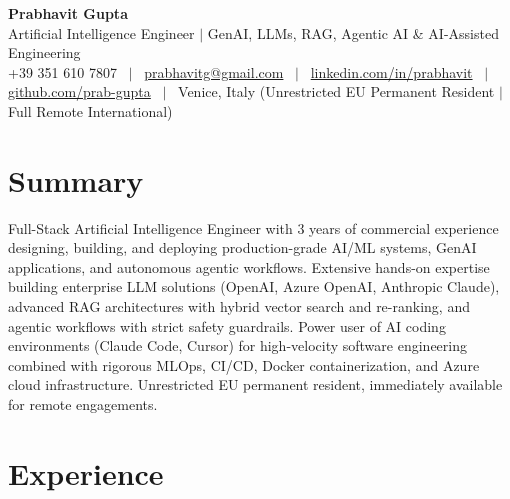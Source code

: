 \documentclass[a4paper,10pt]{article}
\begin{document}
\begin{minipage}[c]{0.80\textwidth}
  {\Huge\bfseries Prabhavit Gupta}\\[3pt]
  {\color{accent}\large Artificial Intelligence Engineer $\vert$ GenAI, LLMs, RAG, Agentic AI \& AI-Assisted Engineering}\\[6pt]
  {\footnotesize +39 351 610 7807 ~$\vert$~
  \href{mailto:prabhavitg@gmail.com}{prabhavitg@gmail.com} ~$\vert$~
  \href{https://www.linkedin.com/in/prabhavit/}{linkedin.com/in/prabhavit} ~$\vert$~
  \href{https://github.com/prab-gupta}{github.com/prab-gupta} ~$\vert$~
  Venice, Italy (Unrestricted EU Permanent Resident $\vert$ Full Remote International)}
\end{minipage}\hfill

\section{Summary}
Full-Stack Artificial Intelligence Engineer with 3 years of commercial experience designing, building, and deploying production-grade AI/ML systems, GenAI applications, and autonomous agentic workflows. Extensive hands-on expertise building enterprise LLM solutions (OpenAI, Azure OpenAI, Anthropic Claude), advanced RAG architectures with hybrid vector search and re-ranking, and agentic workflows with strict safety guardrails. Power user of AI coding environments (Claude Code, Cursor) for high-velocity software engineering combined with rigorous MLOps, CI/CD, Docker containerization, and Azure cloud infrastructure. Unrestricted EU permanent resident, immediately available for remote engagements.

\section{Experience}
\end{document}
